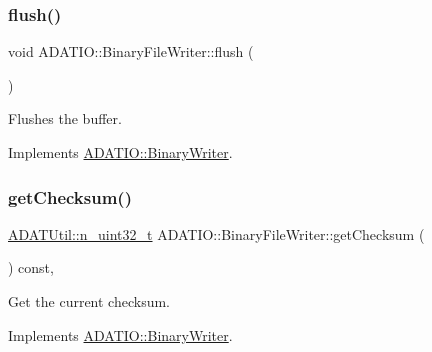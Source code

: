 \subsubsection{\texorpdfstring{flush()}{flush()}\hspace{0.1cm}{\footnotesize\ttfamily [3/3]}}
{\footnotesize\ttfamily void A\+D\+A\+T\+I\+O\+::\+Binary\+File\+Writer\+::flush (\begin{DoxyParamCaption}{ }\end{DoxyParamCaption})\hspace{0.3cm}{\ttfamily [virtual]}}



Flushes the buffer. 



Implements \mbox{\hyperlink{classADATIO_1_1BinaryWriter_a1d335eeed64094b8641f3ebf731c981e}{A\+D\+A\+T\+I\+O\+::\+Binary\+Writer}}.

\mbox{\label{classADATIO_1_1BinaryFileWriter_ad6f9d995a02d4b3e8e12ad18972d58a5}} 
\subsubsection{\texorpdfstring{getChecksum()}{getChecksum()}\hspace{0.1cm}{\footnotesize\ttfamily [1/3]}}
{\footnotesize\ttfamily \mbox{\hyperlink{namespaceADATUtil_ad945a8afa4db2d1f89b731964adae97e}{A\+D\+A\+T\+Util\+::n\+\_\+uint32\+\_\+t}} A\+D\+A\+T\+I\+O\+::\+Binary\+File\+Writer\+::get\+Checksum (\begin{DoxyParamCaption}{ }\end{DoxyParamCaption}) const\hspace{0.3cm}{\ttfamily [inline]}, {\ttfamily [virtual]}}



Get the current checksum. 



Implements \mbox{\hyperlink{classADATIO_1_1BinaryWriter_a8bebb70a7248b14c8a4dcf7aa49c1503}{A\+D\+A\+T\+I\+O\+::\+Binary\+Writer}}.

\mbox{\label{classADATIO_1_1BinaryFileWriter_ad6f9d995a02d4b3e8e12ad18972d58a5}} 
